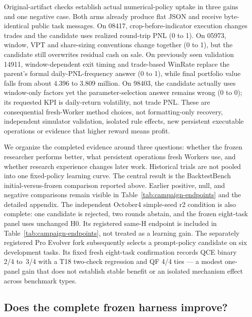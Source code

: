 Original-artifact checks establish actual numerical-policy uptake in three
gains and one negative case. Both arms already produce flat JSON and receive
byte-identical public task messages. On 08417, crop-before-indicator execution
changes trades and the candidate uses realized round-trip PNL (0 to 1).
On 05973, window, VPT and share-sizing conventions change together (0 to 1),
but the candidate still overwrites residual cash on sale. On previously seen
validation 14911, window-dependent exit timing and trade-based WinRate replace
the parent's formal daily-PNL-frequency answer (0 to 1), while final portfolio
value falls from about 4.396 to 3.809 million. On 98403, the candidate actually
uses window-only factors yet the parameter-selection answer remains wrong
(0 to 0); its requested KPI is daily-return volatility, not trade PNL.
These are consequential fresh-Worker method choices, not formatting-only
recovery, independent simulator validation, isolated rule effects, new
persistent executable operations or evidence that higher reward means profit.

We organize the completed evidence around three questions: whether the frozen
researcher performs better, what persistent operations fresh Workers use, and
whether research experience changes later work. Historical trials are not
pooled into one fixed-policy learning curve. The central result is the
BacktestBench initial-versus-frozen comparison reported above. Earlier
positive, null, and negative comparisons remain visible in
Table~\ref{tab:campaign-endpoints} and the detailed appendix.
The independent October4 simple-seed r2 condition is also complete: one
candidate is rejected, two rounds abstain, and the frozen eight-task panel
uses unchanged H0. Its registered same-H endpoint is included in
Table~\ref{tab:campaign-endpoints}, not treated as a learning gain.
The separately registered Pro Evolver fork subsequently selects a prompt-policy
candidate on six development tasks. Its fixed fresh eight-task confirmation
records QCE binary 2/4 to~3/4 with a T18 two-check regression and QF 4/4
ties --- a modest one-panel gain that does not establish stable benefit or
an isolated mechanism effect across benchmark types.

\subsection{Does the complete frozen harness improve?}

